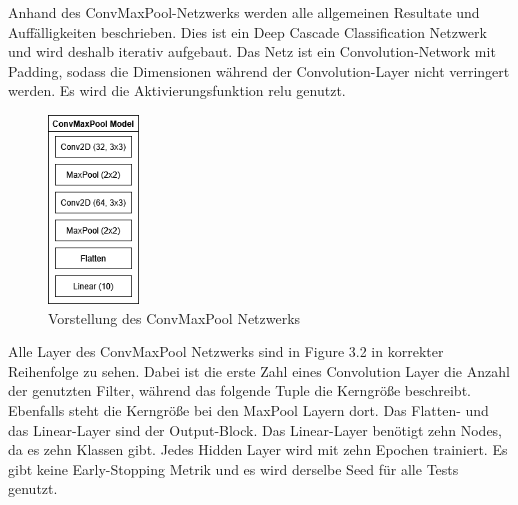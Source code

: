 Anhand des ConvMaxPool-Netzwerks werden alle allgemeinen Resultate und Auffälligkeiten beschrieben. 
Dies ist ein Deep Cascade Classification Netzwerk und wird deshalb iterativ aufgebaut. 
Das Netz ist ein Convolution-Network mit Padding, sodass die Dimensionen während der Convolution-Layer nicht verringert werden. 
Es wird die Aktivierungsfunktion relu genutzt. 

\begin{figure}[htpb]
    \includegraphics[height=5cm]{../../Graphiken/convmaxpool.png}
    \caption{\label{fig:convmaxpool} Vorstellung des ConvMaxPool Netzwerks}
\end{figure}

Alle Layer des ConvMaxPool Netzwerks sind in Figure 3.2 in korrekter Reihenfolge zu sehen. Dabei ist die erste Zahl eines Convolution Layer 
die Anzahl der genutzten Filter, während das folgende Tuple die Kerngröße beschreibt. Ebenfalls steht die Kerngröße bei den MaxPool Layern dort. 
Das Flatten- und das Linear-Layer sind der Output-Block. Das Linear-Layer benötigt zehn Nodes, da es zehn Klassen gibt. Jedes Hidden Layer wird 
mit zehn Epochen trainiert. Es gibt keine Early-Stopping Metrik und es wird derselbe Seed für alle Tests genutzt. 
